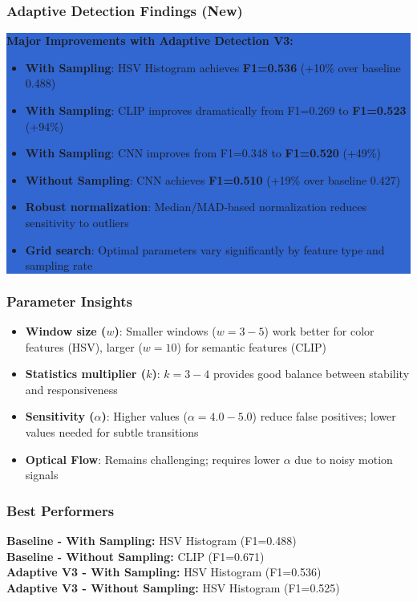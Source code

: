 \documentclass[11pt,a4paper]{article}
\begin{document}
\subsubsection{Adaptive Detection Findings (New)}
\colorbox{highlight}{\parbox{\dimexpr\linewidth-2\fboxsep}{%
\textbf{Major Improvements with Adaptive Detection V3:}
\begin{itemize}
    \item \textbf{With Sampling}: HSV Histogram achieves \textbf{F1=0.536} (+10\% over baseline 0.488)
    \item \textbf{With Sampling}: CLIP improves dramatically from F1=0.269 to \textbf{F1=0.523} (+94\%)
    \item \textbf{With Sampling}: CNN improves from F1=0.348 to \textbf{F1=0.520} (+49\%)
    \item \textbf{Without Sampling}: CNN achieves \textbf{F1=0.510} (+19\% over baseline 0.427)
    \item \textbf{Robust normalization}: Median/MAD-based normalization reduces sensitivity to outliers
    \item \textbf{Grid search}: Optimal parameters vary significantly by feature type and sampling rate
\end{itemize}
}}

\subsubsection{Parameter Insights}
\begin{itemize}
    \item \textbf{Window size ($w$)}: Smaller windows ($w=3-5$) work better for color features (HSV), larger ($w=10$) for semantic features (CLIP)
    \item \textbf{Statistics multiplier ($k$)}: $k=3-4$ provides good balance between stability and responsiveness
    \item \textbf{Sensitivity ($\alpha$)}: Higher values ($\alpha=4.0-5.0$) reduce false positives; lower values needed for subtle transitions
    \item \textbf{Optical Flow}: Remains challenging; requires lower $\alpha$ due to noisy motion signals
\end{itemize}

\subsubsection{Best Performers}
\textbf{Baseline - With Sampling:} HSV Histogram (F1=0.488) \\
\textbf{Baseline - Without Sampling:} CLIP (F1=0.671) \\
\colorbox{bestresult}{\textbf{Adaptive V3 - With Sampling:} HSV Histogram (F1=0.536)} \\
\colorbox{bestresult}{\textbf{Adaptive V3 - Without Sampling:} HSV Histogram (F1=0.525)}
\end{document}
